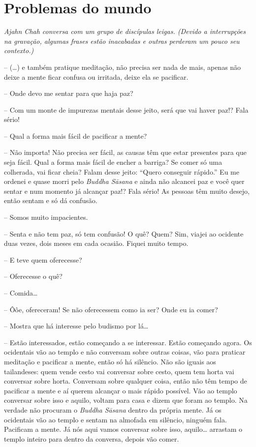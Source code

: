 
\chapter{Problemas do mundo}

{\itshape
Ajahn Chah conversa com um grupo de discípulas leigas. (Devido a
interrupções na gravação, algumas frases estão inacabadas e outras
perderam um pouco seu contexto.)}

-- (…) e também pratique meditação, não precisa ser nada de mais,
apenas não deixe a mente ficar confusa ou irritada, deixe ela se
pacificar.

-- Onde devo me sentar para que haja paz?

-- Com um monte de impurezas mentais desse jeito, será que vai
haver paz!? Fala sério!

-- Qual a forma mais fácil de pacificar a mente?

-- Não importa! Não precisa ser fácil, as causas têm que estar
presentes para que seja fácil. Qual a forma mais fácil de encher a
barriga? Se comer só uma colherada, vai ficar cheia? Falam desse jeito:
“Quero conseguir rápido.” Eu me ordenei e quase morri pelo
\textit{Buddha Sāsana} e ainda não alcancei paz e você quer sentar e
num momento já alcançar paz!? Fala sério! As pessoas têm muito desejo,
então sentam e só dá confusão.

-- Somos muito impacientes.

-- Senta e não tem paz, só tem confusão! O quê? Quem? Sim, viajei
ao ocidente duas vezes, dois meses em cada ocasião. Fiquei muito tempo.

-- E teve quem oferecesse?

-- Oferecesse o quê?

-- Comida…

-- Ôôe, ofereceram! Se não oferecessem como ia ser? Onde eu ia
comer?

-- Mostra que há interesse pelo budismo por lá…

-- Estão interessados, estão começando a se interessar. Estão
começando agora. Os ocidentais vão ao templo e não conversam sobre
outras coisas, vão para praticar meditação e pacificar a mente, então
só há silêncio. Não são iguais aos tailandeses: quem vende cesto vai
conversar sobre cesto, quem tem horta vai conversar sobre horta.
Conversam sobre qualquer coisa, então não têm tempo de pacificar a
mente e aí querem alcançar o mais rápido possível. Vão ao templo
conversar sobre isso e aquilo, voltam para casa e dizem que foram ao
templo. Na verdade não procuram o \textit{Buddha Sāsana} dentro da
própria mente. Já os ocidentais vão ao templo e sentam na almofada em
silêncio, ninguém fala. Pacificam a mente. Já nós aqui vamos conversar
sobre isso, aquilo… arrastam o templo inteiro para dentro da conversa,
depois vão comer.

